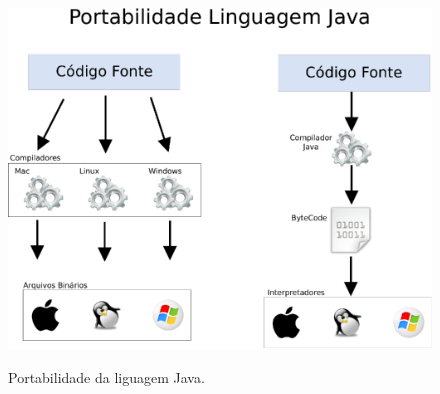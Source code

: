 \begin{figure}[h]
	\center
	\includegraphics[scale=0.8]{Imagens/portabilidadeJava}
	\label{fig:portabilidadeJava}
	\caption{Portabilidade da liguagem Java.}
\end{figure}

